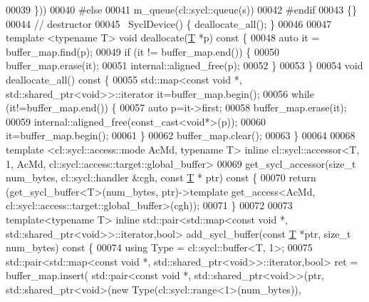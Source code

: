\begin{DoxyCode}
00039   \}))
00040 \textcolor{preprocessor}{#else}
00041   m\_queue(cl::sycl::queue(s))
00042 \textcolor{preprocessor}{#endif}
00043   \{\}
00044   \textcolor{comment}{// destructor}
00045   ~SyclDevice() \{ deallocate\_all(); \}
00046 
00047   \textcolor{keyword}{template} <\textcolor{keyword}{typename} T> \textcolor{keywordtype}{void} deallocate(\hyperlink{group___sparse_core___module_class_eigen_1_1_triplet}{T} *p)\textcolor{keyword}{ const }\{
00048     \textcolor{keyword}{auto} it = buffer\_map.find(p);
00049     \textcolor{keywordflow}{if} (it != buffer\_map.end()) \{
00050       buffer\_map.erase(it);
00051       internal::aligned\_free(p);
00052     \}
00053   \}
00054   \textcolor{keywordtype}{void} deallocate\_all()\textcolor{keyword}{ const }\{
00055     std::map<const void *, std::shared\_ptr<void>>::iterator it=buffer\_map.begin();
00056     \textcolor{keywordflow}{while} (it!=buffer\_map.end()) \{
00057       \textcolor{keyword}{auto} p=it->first;
00058       buffer\_map.erase(it);
00059       internal::aligned\_free(const\_cast<void*>(p));
00060       it=buffer\_map.begin();
00061     \}
00062     buffer\_map.clear();
00063   \}
00064 
00068   \textcolor{keyword}{template} <cl::sycl::access::mode AcMd, \textcolor{keyword}{typename} T> \textcolor{keyword}{inline} cl::sycl::accessor<T, 1, AcMd,
       cl::sycl::access::target::global\_buffer>
00069   get\_sycl\_accessor(\textcolor{keywordtype}{size\_t} num\_bytes, cl::sycl::handler &cgh, \textcolor{keyword}{const} \hyperlink{group___sparse_core___module_class_eigen_1_1_triplet}{T} * ptr)\textcolor{keyword}{ const }\{
00070     \textcolor{keywordflow}{return} (get\_sycl\_buffer<T>(num\_bytes, ptr)->\textcolor{keyword}{template} get\_access<AcMd,
       cl::sycl::access::target::global\_buffer>(cgh));
00071   \}
00072 
00073   \textcolor{keyword}{template}<\textcolor{keyword}{typename} T> \textcolor{keyword}{inline}  std::pair<std::map<const void *, std::shared\_ptr<void>>::iterator,\textcolor{keywordtype}{bool}> 
      add\_sycl\_buffer(\textcolor{keyword}{const} \hyperlink{group___sparse_core___module_class_eigen_1_1_triplet}{T} *ptr, \textcolor{keywordtype}{size\_t} num\_bytes)\textcolor{keyword}{ const }\{
00074     \textcolor{keyword}{using} Type = cl::sycl::buffer<T, 1>;
00075     std::pair<std::map<const void *, std::shared\_ptr<void>>::iterator,\textcolor{keywordtype}{bool}> ret = buffer\_map.insert(
      std::pair<\textcolor{keyword}{const} \textcolor{keywordtype}{void} *, std::shared\_ptr<void>>(ptr, std::shared\_ptr<void>(\textcolor{keyword}{new} Type(cl::sycl::range<1>(num\_bytes)),

\end{DoxyCode}
